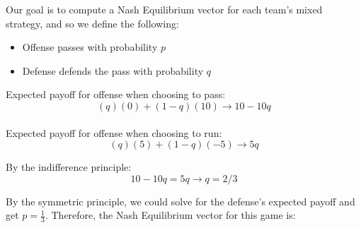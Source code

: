 \documentclass[twoside]{article}
\begin{document}
Our goal is to compute a Nash Equilibrium vector for each team's mixed strategy, and so we define the following:
\begin{itemize}
    \item Offense passes with probability $p$
    \item Defense defends the pass with probability $q$
\end{itemize}

Expected payoff for offense when choosing to pass:
\begin{equation}
    (q)(0) + (1-q)(10) \rightarrow 10 - 10q
\end{equation}
\\
Expected payoff for offense when choosing to run:
\begin{equation}
    (q)(5) + (1-q)(-5) \rightarrow 5q
\end{equation}

By the indifference principle:
\begin{equation}
    10 - 10q = 5q \rightarrow q = 2/3
\end{equation}

By the symmetric principle, we could solve for the defense's expected payoff and get $p=\frac{1}{3}$. Therefore, the Nash Equilibrium vector for this game is:
\begin{equation}
    [(pass=\frac{1}{3}, run=\frac{2}{3}), (defendPass=\frac{2}{3}, defendRun=\frac{1}{3})]
\end{equation}
\end{document}
